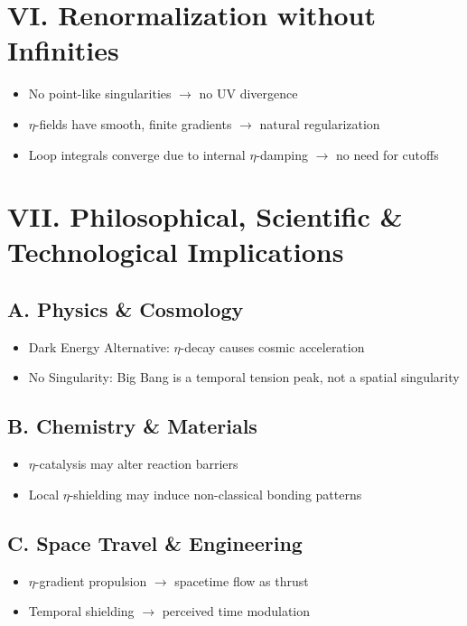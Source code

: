 \documentclass[12pt]{article}
\begin{document}
\section*{VI. Renormalization without Infinities}
\begin{itemize}
  \item No point-like singularities $\rightarrow$ no UV divergence
  \item $\eta$-fields have smooth, finite gradients $\rightarrow$ natural regularization
  \item Loop integrals converge due to internal $\eta$-damping $\rightarrow$ no need for cutoffs
\end{itemize}

\section*{VII. Philosophical, Scientific \& Technological Implications}
\subsection*{A. Physics \& Cosmology}
\begin{itemize}
  \item Dark Energy Alternative: $\eta$-decay causes cosmic acceleration
  \item No Singularity: Big Bang is a temporal tension peak, not a spatial singularity
\end{itemize}

\subsection*{B. Chemistry \& Materials}
\begin{itemize}
  \item $\eta$-catalysis may alter reaction barriers
  \item Local $\eta$-shielding may induce non-classical bonding patterns
\end{itemize}

\subsection*{C. Space Travel \& Engineering}
\begin{itemize}
  \item $\eta$-gradient propulsion $\rightarrow$ spacetime flow as thrust
  \item Temporal shielding $\rightarrow$ perceived time modulation
\end{itemize}
\end{document}
